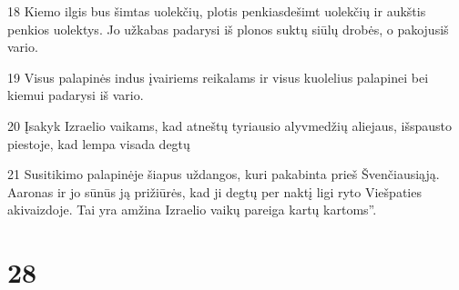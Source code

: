 \par 18 Kiemo ilgis bus šimtas uolekčių, plotis penkiasdešimt uolekčių ir aukštis penkios uolektys. Jo užkabas padarysi iš plonos suktų siūlų drobės, o pakojus­iš vario. 
\par 19 Visus palapinės indus įvairiems reikalams ir visus kuolelius palapinei bei kiemui padarysi iš vario. 
\par 20 Įsakyk Izraelio vaikams, kad atneštų tyriausio alyvmedžių aliejaus, išspausto piestoje, kad lempa visada degtų 
\par 21 Susitikimo palapinėje šiapus uždangos, kuri pakabinta prieš Švenčiausiąją. Aaronas ir jo sūnūs ją prižiūrės, kad ji degtų per naktį ligi ryto Viešpaties akivaizdoje. Tai yra amžina Izraelio vaikų pareiga kartų kartoms”.



\chapter{28}


